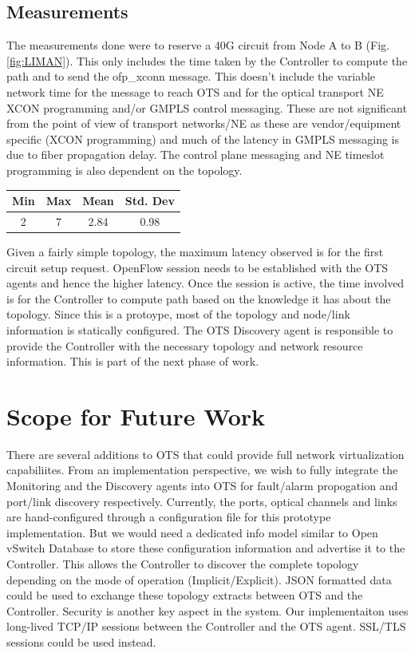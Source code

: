 \documentclass{sig-alternate-10pt}
\begin{document}
	\subsection{Measurements}
	\label{sec:measure}
	The measurements done were to reserve a 40G circuit from Node A to B (Fig. \ref{fig:LIMAN}). This only includes the time 
	taken by the Controller to compute the path and to send the ofp\_xconn message. This doesn't include the variable
	network time for the message to reach OTS and for the optical transport NE XCON programming and/or GMPLS control
	messaging. These are not significant from the point of view of transport networks/NE as these are vendor/equipment
	specific (XCON programming) and much of the latency in GMPLS messaging is due to fiber propagation delay. The control
	plane messaging and NE timeslot programming is also dependent on the topology.

	\begin{center}
		\begin{tabular} { |  c | c | c | c | }
			\hline
			 Min & Max & Mean & Std. Dev \\ \hline
			  2   &   7    & 2.84  & 0.98 \\
			\hline
		\end{tabular}
		\label{tab:measurements}
	\end{center}

	Given a fairly simple topology, the maximum latency observed is for the first circuit setup request. OpenFlow session needs
	to be established with the OTS agents and hence the higher latency. Once the session is active, the time involved is for the
	Controller to compute path based on the knowledge it has about the topology. Since this is a protoype, most of the topology
	and node/link information is statically configured. The OTS Discovery agent is responsible to provide the Controller with the
	necessary topology and network resource information. This is part of the next phase of work.

\section{Scope for Future Work}
\label{sec:future}
	There are several additions to OTS that could provide full network virtualization capabiliites. From an
	implementation perspective, we wish to fully integrate the Monitoring and the Discovery agents into
	OTS for fault/alarm propogation and port/link discovery respectively. Currently, the ports, optical 
	channels and links are hand-configured through a configuration file for this prototype implementation.
	But we would need a dedicated info model similar to Open vSwitch Database \cite{ovsdb} to store
	these configuration information and advertise it to the Controller. This allows the Controller to discover
	the complete topology depending on the mode of operation (Implicit/Explicit). JSON formatted data 
	could be used to exchange these topology extracts between OTS and the Controller. Security is another
	key aspect in the system. Our implementaiton uses long-lived TCP/IP sessions between the Controller
	and the OTS agent. SSL/TLS sessions could be used instead. \\
\end{document}
